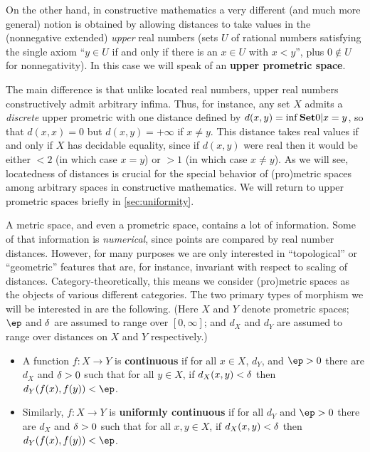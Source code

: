 \documentclass{article}
\def\Rp{[0,\infty]}
\begin{document}
On the other hand, in constructive mathematics a very different (and much more general) notion is obtained by allowing distances to take values in the (nonnegative extended) \emph{upper} real numbers (sets $U$ of rational numbers satisfying the single axiom ``$y\in U$ if and only if there is an $x\in U$ with $x<y$'', plus $0\notin U$ for nonnegativity).
In this case we will speak of an \textbf{upper prometric space}.

The main difference is that unlike located real numbers, upper real numbers constructively admit arbitrary infima.
Thus, for instance, any set $X$ admits a \emph{discrete} upper prometric with one distance defined by $d(x,y) = \inf \setof{ 0 | x=y }$, so that $d(x,x)=0$ but $d(x,y)=+\infty$ if $x\neq y$.
This distance takes real values if and only if $X$ has decidable equality, since if $d(x,y)$ were real then it would be either $<2$ (in which case $x=y$) or $>1$ (in which case $x\neq y$).
As we will see, locatedness of distances is crucial for the special behavior of (pro)metric spaces among arbitrary spaces in constructive mathematics.
We will return to upper prometric spaces briefly in \cref{sec:uniformity}.

A metric space, and even a prometric space, contains a lot of information.
Some of that information is \emph{numerical}, since points are compared by real number distances.
However, for many purposes we are only interested in ``topological'' or ``geometric'' features that are, for instance, invariant with respect to scaling of distances.
Category-theoretically, this means we consider (pro)metric spaces as the objects of various different categories.
The two primary types of morphism we will be interested in are the following.
(Here $X$ and $Y$ denote prometric spaces; $\ep$ and $\delta$ are assumed to range over $\Rp$; and $d_X$ and $d_Y$ are assumed to range over distances on $X$ and $Y$ respectively.)

\begin{itemize}
\item A function $f:X\to Y$ is \textbf{continuous} if for all $x\in X$, $d_Y$, and $\ep>0$ there are $d_X$ and $\delta>0$ such that for all $y\in X$, if $d_X(x,y)<\delta$ then $d_Y(f(x),f(y))<\ep$.
\item Similarly, $f:X\to Y$ is \textbf{uniformly continuous} if for all $d_Y$ and $\ep>0$ there are $d_X$ and $\delta>0$ such that for all $x,y\in X$, if $d_X(x,y)<\delta$ then $d_Y(f(x),f(y))<\ep$.
\end{itemize}
\end{document}
